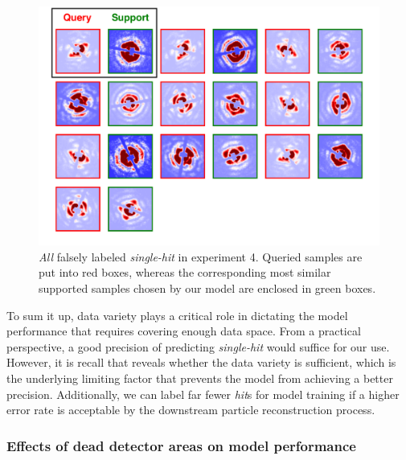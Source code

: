 \begin{figure}
\includegraphics[width=\textwidth,keepaspectratio]
{figures/false_label.single.real.pdf}

\caption{\textit{All} falsely labeled \textit{single-hit} in experiment 4.
Queried samples are put into red boxes, whereas the corresponding most similar
supported samples chosen by our model are enclosed in green boxes.}

\label{fig : false single real}
\end{figure}


To sum it up, data variety plays a critical role in dictating the model
performance that requires covering enough data space.  From a practical
perspective, a good precision of predicting \textit{single-hit} would suffice
for our use.  However, it is recall that reveals whether the data variety is
sufficient, which is the underlying limiting factor that prevents the model from
achieving a better precision.  Additionally, we can label far fewer \textit{hit}s 
for model training if a higher error rate is acceptable by the downstream
particle reconstruction process.  


\subsubsection{Effects of dead detector areas on model performance}

